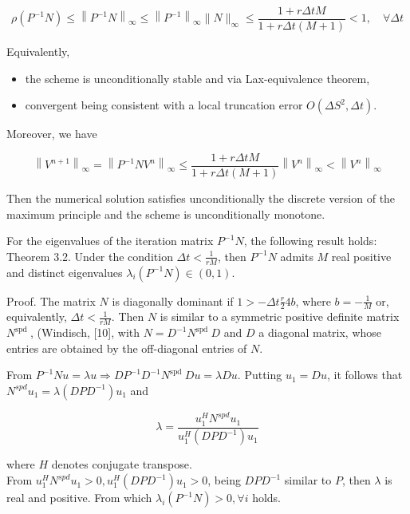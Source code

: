 \documentclass[10pt]{article}
\begin{document}
$$
\rho\left(P^{-1} N\right) \leq\left\|P^{-1} N\right\|_{\infty} \leq\left\|P^{-1}\right\|_{\infty}\|N\|_{\infty} \leq \frac{1+r \Delta t M}{1+r \Delta t(M+1)}<1, \quad \forall \Delta t
$$

Equivalently,

\begin{itemize}
  \item the scheme is unconditionally stable and via Lax-equivalence theorem,
  \item convergent being consistent with a local truncation error $O\left(\Delta S^{2}, \Delta t\right)$.
\end{itemize}

Moreover, we have

$$
\left\|V^{n+1}\right\|_{\infty}=\left\|P^{-1} N V^{n}\right\|_{\infty} \leq \frac{1+r \Delta t M}{1+r \Delta t(M+1)}\left\|V^{n}\right\|_{\infty}<\left\|V^{n}\right\|_{\infty}
$$

Then the numerical solution satisfies unconditionally the discrete version of the maximum principle and the scheme is unconditionally monotone.

For the eigenvalues of the iteration matrix $P^{-1} N$, the following result holds:\\
Theorem 3.2. Under the condition $\Delta t<\frac{1}{r M}$, then $P^{-1} N$ admits $M$ real positive and distinct eigenvalues $\lambda_{i}\left(P^{-1} N\right) \in(0,1)$.

Proof. The matrix $N$ is diagonally dominant if $1>-\Delta t \frac{r}{2} 4 b$, where $b=-\frac{1}{M}$ or, equivalently, $\Delta t<\frac{1}{r M}$. Then $N$ is similar to a symmetric positive definite matrix $N^{\text {spd }}$, (Windisch, [10], with $N=D^{-1} N^{\text {spd }} D$ and $D$ a diagonal matrix, whose entries are obtained by the off-diagonal entries of $N$.

From $P^{-1} N u=\lambda u \Rightarrow D P^{-1} D^{-1} N^{\text {spd }} D u=\lambda D u$. Putting $u_{1}=D u$, it follows that $N^{s p d} u_{1}=\lambda\left(D P D^{-1}\right) u_{1}$ and

$$
\lambda=\frac{u_{1}^{H} N^{s p d} u_{1}}{u_{1}^{H}\left(D P D^{-1}\right) u_{1}}
$$

where $H$ denotes conjugate transpose.\\
From $u_{1}^{H} N^{s p d} u_{1}>0, u_{1}^{H}\left(D P D^{-1}\right) u_{1}>0$, being $D P D^{-1}$ similar to $P$, then $\lambda$ is real and positive. From which $\lambda_{i}\left(P^{-1} N\right)>0, \forall i$ holds.
\end{document}
